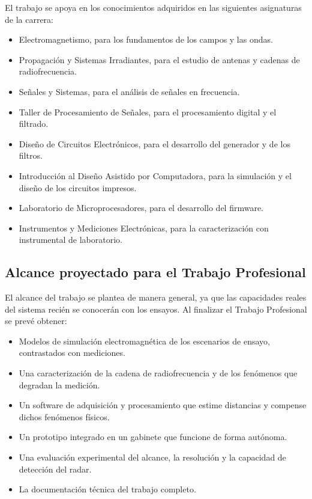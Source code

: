 \documentclass[11pt, a4paper, oneside]{article}
\begin{document}
El trabajo se apoya en los conocimientos adquiridos en las siguientes
asignaturas de la carrera:
\begin{itemize}
  \item Electromagnetismo, para los fundamentos de los campos y las
        ondas.
  \item Propagación y Sistemas Irradiantes, para el estudio de antenas
        y cadenas de radiofrecuencia.
  \item Señales y Sistemas, para el análisis de señales en frecuencia.
  \item Taller de Procesamiento de Señales, para el procesamiento
        digital y el filtrado.
  \item Diseño de Circuitos Electrónicos, para el desarrollo del
        generador y de los filtros.
  \item Introducción al Diseño Asistido por Computadora, para la
        simulación y el diseño de los circuitos impresos.
  \item Laboratorio de Microprocesadores, para el desarrollo del
        firmware.
  \item Instrumentos y Mediciones Electrónicas, para la caracterización
        con instrumental de laboratorio.
\end{itemize}

\subsection{Alcance proyectado para el Trabajo Profesional}

El alcance del trabajo se plantea de manera general, ya que las
capacidades reales del sistema recién se conocerán con los ensayos. Al
finalizar el Trabajo Profesional se prevé obtener:
\begin{itemize}
  \item Modelos de simulación electromagnética de los escenarios de
        ensayo, contrastados con mediciones.
  \item Una caracterización de la cadena de radiofrecuencia y de los
        fenómenos que degradan la medición.
  \item Un software de adquisición y procesamiento que estime
        distancias y compense dichos fenómenos físicos.
  \item Un prototipo integrado en un gabinete que funcione de forma
        autónoma.
  \item Una evaluación experimental del alcance, la resolución y la
        capacidad de detección del radar.
  \item La documentación técnica del trabajo completo.
\end{itemize}
\end{document}
